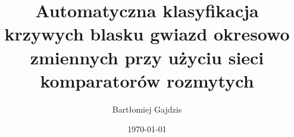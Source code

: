 \documentclass[magisterska]{pracalicmgr}
\author{Bartłomiej Gajdzis}
\title{Automatyczna klasyfikacja krzywych blasku gwiazd okresowo zmiennych przy użyciu sieci komparatorów rozmytych}
\date{\today}
\begin{document}
\maketitle
\let\cleardoublepage\clearpage

	
	
\clearpage
\tableofcontents
\clearpage	
\end{document}
